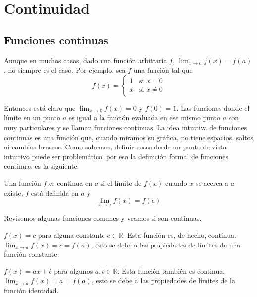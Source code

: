 \documentclass{report}
\begin{document}
    \chapter{Continuidad}

    \section{Funciones continuas}

    Aunque en muchos casos, dado una función arbitraria $f$, $\lim_{x \to a} f(x) = f(a)$, no siempre es el caso. Por ejemplo, sea $f$ una función tal que
    $$f(x) = \begin{cases}
        1 & \text{si } x = 0\\
        x & \text{si } x \neq 0
    \end{cases}$$

    Entonces está claro que $\lim_{x \to 0} f(x) = 0$ y $f(0) = 1$. Las funciones donde el límite en un punto $a$ es igual a la función evaluada en ese mismo punto $a$ son muy particulares y se llaman funciones continuas. La idea intuitiva de funciones continuas es una función que, cuando miramos su gráfica, no tiene espacios, saltos ni cambios bruscos. Como sabemos, definir cosas desde un punto de vista intuitivo puede ser problemático, por eso la definición formal de funciones continuas es la siguiente:\\

    \begin{defBox}
        Una función $f$ es continua en $a$ si el límite de $f(x)$ cuando $x$ se acerca a $a$ existe, $f$ está definida en $a$ y $$\lim_{x \to a}f(x) = f(a)$$
    \end{defBox}

    Revisemos algunas funciones comunes y veamos si son continuas.

    \begin{Example}
        $f(x) = c$ para alguna constante $c \in \mathbb{R}$. Esta función es, de hecho, continua. $\lim_{x \to a}f(x) = c = f(a)$, esto se debe a las propiedades de límites de una función constante.
    \end{Example}

    \begin{Example}
        $f(x) = ax+b$ para algunos $a, b \in \mathbb{R}$. Esta función también es continua. $\lim_{x \to a}f(x) = a = f(a)$, esto se debe a las propiedades de límites de la función identidad.
    \end{Example}
\end{document}
